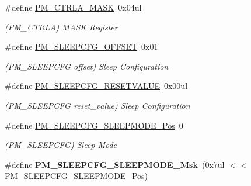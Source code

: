 \begin{DoxyCompactItemize}
\item 
\hypertarget{group___s_a_m_l21___p_m_ga9dc3e7122cd1ad4fe6d1764dbabc1957}{}\#define \hyperlink{group___s_a_m_l21___p_m_ga9dc3e7122cd1ad4fe6d1764dbabc1957}{P\+M\+\_\+\+C\+T\+R\+L\+A\+\_\+\+M\+A\+S\+K}~0x04ul\label{group___s_a_m_l21___p_m_ga9dc3e7122cd1ad4fe6d1764dbabc1957}

\begin{DoxyCompactList}\small\item\em (P\+M\+\_\+\+C\+T\+R\+L\+A) M\+A\+S\+K Register \end{DoxyCompactList}\item 
\hypertarget{group___s_a_m_l21___p_m_gaaf4fb96895e38d59c94cd6b6991cd97f}{}\#define \hyperlink{group___s_a_m_l21___p_m_gaaf4fb96895e38d59c94cd6b6991cd97f}{P\+M\+\_\+\+S\+L\+E\+E\+P\+C\+F\+G\+\_\+\+O\+F\+F\+S\+E\+T}~0x01\label{group___s_a_m_l21___p_m_gaaf4fb96895e38d59c94cd6b6991cd97f}

\begin{DoxyCompactList}\small\item\em (P\+M\+\_\+\+S\+L\+E\+E\+P\+C\+F\+G offset) Sleep Configuration \end{DoxyCompactList}\item 
\hypertarget{group___s_a_m_l21___p_m_ga23e99f0924363f28017cdd0d725efb7a}{}\#define \hyperlink{group___s_a_m_l21___p_m_ga23e99f0924363f28017cdd0d725efb7a}{P\+M\+\_\+\+S\+L\+E\+E\+P\+C\+F\+G\+\_\+\+R\+E\+S\+E\+T\+V\+A\+L\+U\+E}~0x00ul\label{group___s_a_m_l21___p_m_ga23e99f0924363f28017cdd0d725efb7a}

\begin{DoxyCompactList}\small\item\em (P\+M\+\_\+\+S\+L\+E\+E\+P\+C\+F\+G reset\+\_\+value) Sleep Configuration \end{DoxyCompactList}\item 
\hypertarget{group___s_a_m_l21___p_m_ga35bc67c3429373f2ad67992a2c731a59}{}\#define \hyperlink{group___s_a_m_l21___p_m_ga35bc67c3429373f2ad67992a2c731a59}{P\+M\+\_\+\+S\+L\+E\+E\+P\+C\+F\+G\+\_\+\+S\+L\+E\+E\+P\+M\+O\+D\+E\+\_\+\+Pos}~0\label{group___s_a_m_l21___p_m_ga35bc67c3429373f2ad67992a2c731a59}

\begin{DoxyCompactList}\small\item\em (P\+M\+\_\+\+S\+L\+E\+E\+P\+C\+F\+G) Sleep Mode \end{DoxyCompactList}\item 
\hypertarget{group___s_a_m_l21___p_m_gaa7f010ada439bb8d744c9a9709f4c7ff}{}\#define {\bfseries P\+M\+\_\+\+S\+L\+E\+E\+P\+C\+F\+G\+\_\+\+S\+L\+E\+E\+P\+M\+O\+D\+E\+\_\+\+Msk}~(0x7ul $<$$<$ P\+M\+\_\+\+S\+L\+E\+E\+P\+C\+F\+G\+\_\+\+S\+L\+E\+E\+P\+M\+O\+D\+E\+\_\+\+Pos)\label{group___s_a_m_l21___p_m_gaa7f010ada439bb8d744c9a9709f4c7ff}


\end{DoxyCompactItemize}
